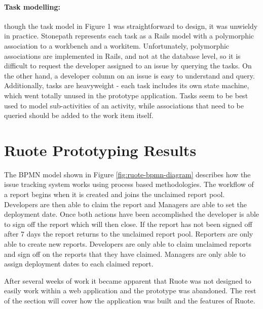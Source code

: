 \documentclass[document.tex]{subfiles}
\begin{document}
\paragraph{Task modelling:} though the task model in Figure 1 was straightforward to design, it was unwieldy in practice. Stonepath represents each task as a Rails model with a polymorphic association to a workbench and a workitem. Unfortunately, polymorphic associations are implemented in Rails, and not at the database level, so it is difficult to request the developer assigned to an issue by querying the tasks. On the other hand, a developer column on an issue is easy to understand and query. Additionally, tasks are heavyweight - each task includes its own state machine, which went totally unused in the prototype application. Tasks seem to be best used to model sub-activities of an activity, while associations that need to be queried should be added to the work item itself.


\FloatBarrier

\section {Ruote Prototyping Results}
\label {sec:ruote-prototyping-results}

The BPMN model shown in Figure \ref{fig:ruote-bpmn-diagram} describes how the issue tracking system works using process based methodologies. The workflow of a report begins when it is created and joins the unclaimed report pool. Developers are then able to claim the report and Managers are able to set the deployment date. Once both actions have been accomplished the developer is able to sign off the report which will then close. If the report has not been signed off after 7 days the report returns to the unclaimed report pool. Reporters are only able to create new reports. Developers are only able to claim unclaimed reports and sign off on the reports that they have claimed. Managers are only able to assign deployment dates to each claimed report.

After several weeks of work it became apparent that Ruote was not designed to easily work within a web application and the prototype was abandoned. The rest of the section will cover how the application was built and the features of Ruote.
\end{document}
